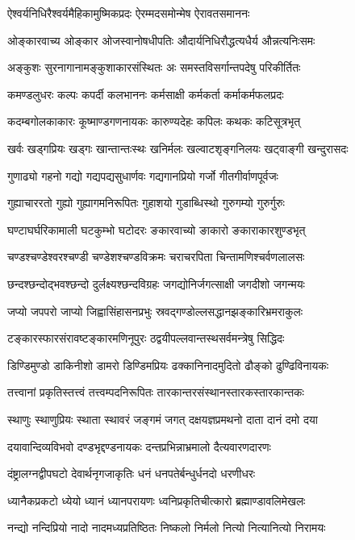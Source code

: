 \twolineshloka
{ऐश्वर्यनिधिरैश्वर्यमैहिकामुष्मिकप्रदः}
{ऐरम्मदसमोन्मेष ऐरावतसमाननः}

\twolineshloka
{ओङ्कारवाच्य ओङ्कार ओजस्वानोषधीपतिः}
{औदार्यनिधिरौद्धत्यधैर्य औन्नत्यनिःसमः}

\twolineshloka
{अङ्कुशः सुरनागानामङ्कुशाकारसंस्थितः}
{अः समस्तविसर्गान्तपदेषु परिकीर्तितः}

\twolineshloka
{कमण्डलुधरः कल्पः कपर्दी कलभाननः}
{कर्मसाक्षी कर्मकर्ता कर्माकर्मफलप्रदः}

\twolineshloka
{कदम्बगोलकाकारः कूष्माण्डगणनायकः}
{कारुण्यदेहः कपिलः कथकः कटिसूत्रभृत्}

\twolineshloka
{खर्वः खड्गप्रियः खड्गः खान्तान्तःस्थः खनिर्मलः}
{खल्वाटशृङ्गनिलयः खट्वाङ्गी खन्दुरासदः}

\twolineshloka
{गुणाढ्यो गहनो गद्यो गद्यपद्यसुधार्णवः}
{गद्यगानप्रियो गर्जो गीतगीर्वाणपूर्वजः}

\twolineshloka
{गुह्याचाररतो गुह्यो गुह्यागमनिरूपितः}
{गुहाशयो गुडाब्धिस्थो गुरुगम्यो गुरुर्गुरुः}

\twolineshloka
{घण्टाघर्घरिकामाली घटकुम्भो घटोदरः}
{ङकारवाच्यो ङाकारो ङकाराकारशुण्डभृत्}

\twolineshloka
{चण्डश्चण्डेश्वरश्चण्डी चण्डेशश्चण्डविक्रमः}
{चराचरपिता चिन्तामणिश्चर्वणलालसः}

\twolineshloka
{छन्दश्छन्दोद्भवश्छन्दो दुर्लक्ष्यश्छन्दविग्रहः}
{जगद्योनिर्जगत्साक्षी जगदीशो जगन्मयः}

\twolineshloka
{जप्यो जपपरो जाप्यो जिह्वासिंहासनप्रभुः}
{स्रवद्गण्डोल्लसद्धानझङ्कारिभ्रमराकुलः}

\twolineshloka
{टङ्कारस्फारसंरावष्टङ्कारमणिनूपुरः}
{ठद्वयीपल्लवान्तस्थसर्वमन्त्रेषु सिद्धिदः}

\twolineshloka
{डिण्डिमुण्डो डाकिनीशो डामरो डिण्डिमप्रियः}
{ढक्कानिनादमुदितो ढौङ्को ढुण्ढिविनायकः}

\twolineshloka
{तत्त्वानां प्रकृतिस्तत्त्वं तत्त्वम्पदनिरूपितः}
{तारकान्तरसंस्थानस्तारकस्तारकान्तकः}

\twolineshloka
{स्थाणुः स्थाणुप्रियः स्थाता स्थावरं जङ्गमं जगत्}
{दक्षयज्ञप्रमथनो दाता दानं दमो दया}

\twolineshloka
{दयावान्दिव्यविभवो दण्डभृद्दण्डनायकः}
{दन्तप्रभिन्नाभ्रमालो दैत्यवारणदारणः}

\twolineshloka
{दंष्ट्रालग्नद्वीपघटो देवार्थनृगजाकृतिः}
{धनं धनपतेर्बन्धुर्धनदो धरणीधरः}

\twolineshloka
{ध्यानैकप्रकटो ध्येयो ध्यानं ध्यानपरायणः}
{ध्वनिप्रकृतिचीत्कारो ब्रह्माण्डावलिमेखलः}

\twolineshloka
{नन्द्यो नन्दिप्रियो नादो नादमध्यप्रतिष्ठितः}
{निष्कलो निर्मलो नित्यो नित्यानित्यो निरामयः}

